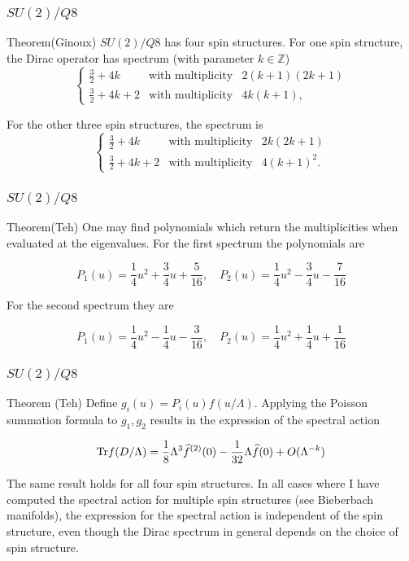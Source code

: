 \documentclass{beamer}
\def\Z{{\mathbb Z}}
\def\Tr{{\rm Tr}}
\begin{document}
\begin{frame}
	\frametitle{$SU(2)/Q8$}
	\begin{block}{Theorem(Ginoux)}
	$SU(2)/Q8$ has four spin structures. For one spin structure, the Dirac operator has spectrum (with parameter $k \in \Z$)
	\[
	\left\{ \begin{array}{lll}
\frac{3}{2} + 4k & \text{with multiplicity} & 2(k+1)(2k+1) \\[2mm]
\frac{3}{2} + 4k +2 & \text{with multiplicity} & 4k(k+1),
\end{array}\right.
	\]
	
	For the other three spin structures, the spectrum is
	\[
\left\{ \begin{array}{lll}
\frac{3}{2} + 4k & \text{with multiplicity} & 2k(2k+1) \\[2mm]
\frac{3}{2} + 4k +2 & \text{with multiplicity} & 4(k+1)^2.
\end{array}\right.
	\]
	\end{block}
\end{frame}

\begin{frame}
	\frametitle{$SU(2)/Q8$}
	\begin{block}{Theorem(Teh)}
		One may find polynomials which return the multiplicities when evaluated at the eigenvalues. For the first spectrum the polynomials are
		
		\[
P_1(u) =\frac{1}{4} u^2 + \frac{3}{4} u + \frac{5}{16}, \quad P_2(u) =  \frac{1}{4} u^2 - \frac{3}{4} u - \frac{7}{16}
		\]
		
		For the second spectrum they are
		
		\[
P_1(u)  = \frac{1}{4} u^2 - \frac{1}{4} u - \frac{3}{16}, \quad P_2(u)  = \frac{1}{4} u^2 + \frac{1}{4} u + \frac{1}{16}
		\]
	\end{block}
\end{frame}

\begin{frame}
	\frametitle{$SU(2)/Q8$}
	\begin{block}{Theorem (Teh)}
		Define $g_i(u) = P_i(u)f(u/\Lambda)$. Applying the Poisson summation formula to $g_1, g_2$ results in the expression of the spectral action
		
		\[
		\Tr f(D/\Lambda) = \frac{1}{8}\Lambda^3 \widehat{f}^{(2)}(0) - \frac{1}{32}\Lambda \widehat{f}(0) + O(\Lambda^{-k})
		\]
	\end{block}
	
	\pause
	
	\begin{block}{}
		The same result holds for all four spin structures. In all cases where I have computed the spectral action for multiple spin structures (see Bieberbach manifolds), the expression for the spectral action is independent of the spin structure, even though the Dirac spectrum in general depends on the choice of spin structure.
	\end{block}
\end{frame}
\end{document}
